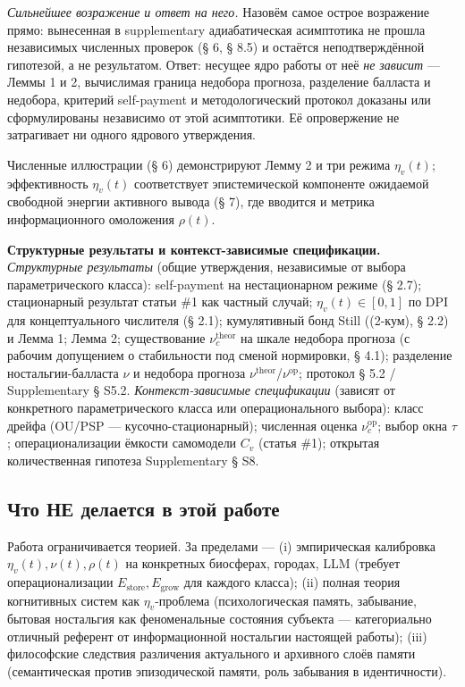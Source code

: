 \documentclass[pdflatex,sn-mathphys-ay]{sn-jnl}
\begin{document}
\emph{Сильнейшее возражение и ответ на него.} Назовём самое острое возражение прямо: вынесенная в supplementary адиабатическая асимптотика не прошла независимых численных проверок (§ 6, § 8.5) и остаётся неподтверждённой гипотезой, а не результатом. Ответ: несущее ядро работы от неё \emph{не зависит} --- Леммы 1 и 2, вычислимая граница недобора прогноза, разделение балласта и недобора, критерий self-payment и методологический протокол доказаны или сформулированы независимо от этой асимптотики. Её опровержение не затрагивает ни одного ядрового утверждения.



Численные иллюстрации (§ 6) демонстрируют Лемму 2 и три режима \(\eta_v(t)\); эффективность \(\eta_v(t)\) соответствует эпистемической компоненте ожидаемой свободной энергии активного вывода (§ 7), где вводится и метрика информационного омоложения \(\rho(t)\).



\textbf{Структурные результаты и контекст-зависимые спецификации.} \emph{Структурные результаты} (общие утверждения, независимые от выбора параметрического класса): self-payment на нестационарном режиме (§ 2.7); стационарный результат статьи \#1 как частный случай; \(\eta_v(t) \in [0, 1]\) по DPI для концептуального числителя (§ 2.1); кумулятивный бонд Still ((2-кум), § 2.2) и Лемма 1; Лемма 2; существование \(\nu_c^{\text{theor}}\) на шкале недобора прогноза (с рабочим допущением о стабильности под сменой нормировки, § 4.1); разделение ностальгии-балласта \(\nu\) и недобора прогноза \(\nu^{\text{theor}}\)/\(\nu^{\text{op}}\); протокол § 5.2 / Supplementary § S5.2. \emph{Контекст-зависимые спецификации} (зависят от конкретного параметрического класса или операционального выбора): класс дрейфа (OU/PSP --- кусочно-стационарный); численная оценка \(\nu_c^{\text{op}}\); выбор окна \(\tau\); операционализации ёмкости самомодели \(C_v\) (статья \#1); открытая количественная гипотеза Supplementary § S8.



\subsection{Что НЕ делается в этой работе}\label{ux447ux442ux43e-ux43dux435-ux434ux435ux43bux430ux435ux442ux441ux44f-ux432-ux44dux442ux43eux439-ux440ux430ux431ux43eux442ux435}



Работа ограничивается теорией. За пределами --- (i) эмпирическая калибровка \(\eta_v(t), \nu(t), \rho(t)\) на конкретных биосферах, городах, LLM (требует операционализации \(E_{\text{store}}, E_{\text{grow}}\) для каждого класса); (ii) полная теория когнитивных систем как \(\eta_v\)-проблема (психологическая память, забывание, бытовая ностальгия как феноменальные состояния субъекта --- категориально отличный референт от информационной ностальгии настоящей работы); (iii) философские следствия различения актуального и архивного слоёв памяти (семантическая против эпизодической памяти, роль забывания в идентичности).
\end{document}
